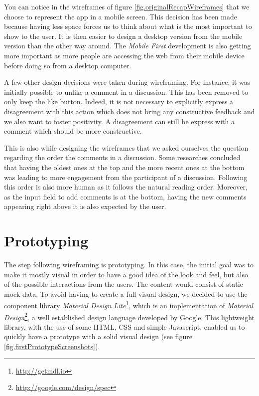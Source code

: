 \documentclass[a4paper,12pt,twoside]{article}
\begin{document}
You can notice in the wireframes of figure \ref{fig.originalRecapWireframes} that we choose to represent the app in a mobile screen.
This decision has been made because having less space forces us to think about what is the most important to show to the user.
It is then easier to design a desktop version from the mobile version than the other way around.
The \emph{Mobile First} development is also getting more important as more people are accessing the web from their mobile device before doing so from a desktop computer.

A few other design decisions were taken during wireframing.
For instance, it was initially possible to unlike a comment in a discussion.
This has been removed to only keep the like button.
Indeed, it is not necessary to explicitly express a disagreement with this action which does not bring any constructive feedback and we also want to foster positivity.
A disagreement can still be express with a comment which should be more constructive.

This is also while designing the wireframes that we asked ourselves the question regarding the order the comments in a discussion.
Some researches \cite{mabande2010designing} concluded that having the oldest ones at the top and the more recent ones at the bottom was leading to more engagement from the participant of a discussion.
Following this order is also more human as it follows the natural reading order.
Moreover, as the input field to add comments is at the bottom, having the new comments appearing right above it is also expected by the user.

\section{Prototyping}
The step following wireframing is prototyping.
In this case, the initial goal was to make it mostly visual in order to have a good idea of the look and feel, but also of the possible interactions from the users.
The content would consist of static mock data.
To avoid having to create a full visual design, we decided to use the component library \emph{Material Design Lite}\footnote{\url{http://getmdl.io}}, which is an implementation of \emph{Material Design}\footnote{\url{http://google.com/design/spec}}, a well established design language developed by Google.
This lightweight library, with the use of some HTML, CSS and simple Javascript, enabled us to quickly have a prototype with a solid visual design (see figure \ref{fig.firstPrototypeScreenshots}).
\end{document}
